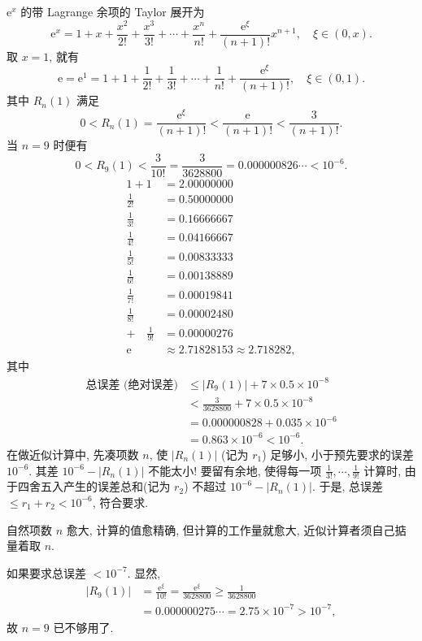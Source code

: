\begin{solution}
$\mathrm{e}^{x}$ 的带 Lagrange 余项的 Taylor 展开为
\[
\mathrm{e}^{x}=1+x+\frac{x^{2}}{2!}+\frac{x^{3}}{3!}+\cdots+\frac{x^{n}}{n!}+\frac{\mathrm{e}^{\xi}}{(n+1)!}x^{n+1},\quad\xi\in(0,x).
\]
取 $x=1$, 就有
\[
\mathrm{e}=\mathrm{e}^{1}=1+1+\frac{1}{2!}+\frac{1}{3!}+\cdots+\frac{1}{n!}+\frac{\mathrm{e}^{\xi}}{(n+1)!},\quad\xi\in(0,1).
\]
其中 $R_{n}(1)$ 满足
\[
0<R_{n}(1)=\frac{\mathrm{e}^{\xi}}{(n+1)!}<\frac{\mathrm{e}}{(n+1)!}<\frac{3}{(n+1)!}.
\]
当 $n=9$ 时便有
\[
0<R_{9}(1)<\frac{3}{10!}=\frac{3}{3628800}=0.000000826\cdots<10^{-6}.
\]
\begin{align*}
1+1 &= 2.00000000 \\
\frac{1}{2!} &= 0.50000000 \\
\frac{1}{3!} &= 0.16666667 \\
\frac{1}{4!} &= 0.04166667 \\
\frac{1}{5!} &= 0.00833333 \\
\frac{1}{6!} &= 0.00138889 \\
\frac{1}{7!} &= 0.00019841 \\
\frac{1}{8!} &= 0.00002480 \\
+\quad \frac{1}{9!} &= 0.00000276 \\
\hline
\mathrm{e} &\approx 2.71828153 \approx 2.718282,
\end{align*}
其中
\begin{align*}
\text{总误差 (绝对误差)}
&\leqslant |R_{9}(1)|+7\times 0.5\times 10^{-8} \\
&< \frac{3}{3628800}+7\times 0.5\times 10^{-8} \\
&= 0.000000828+0.035\times 10^{-6} \\
&= 0.863\times 10^{-6}<10^{-6}.
\end{align*}
在做近似计算中, 先凑项数 $n$, 使 $|R_{n}(1)|$ (记为 $r_{1}$) 足够小, 小于预先要求的误差 $10^{-6}$. 其差 $10^{-6}-|R_{n}(1)|$ 不能太小! 要留有余地, 使得每一项 $\frac{1}{3!},\cdots,\frac{1}{9!}$ 计算时, 由于四舍五入产生的误差总和(记为 $r_{2}$) 不超过 $10^{-6}-|R_{n}(1)|$. 于是, 总误差 $\leqslant r_{1}+r_{2}<10^{-6}$, 符合要求.

自然项数 $n$ 愈大, 计算的值愈精确, 但计算的工作量就愈大, 近似计算者须自己掂量着取 $n$.

如果要求总误差 $<10^{-7}$. 显然,
\begin{align*}
|R_{9}(1)|
&=\frac{\mathrm{e}^{\xi}}{10!}=\frac{\mathrm{e}^{\xi}}{3628800}\geqslant\frac{1}{3628800} \\
&=0.000000275\cdots=2.75\times 10^{-7}>10^{-7},
\end{align*}
故 $n=9$ 已不够用了.


\end{solution}
